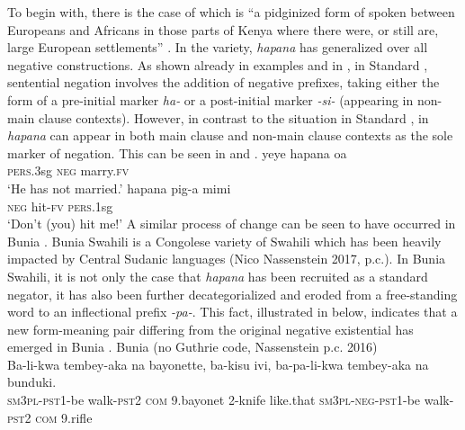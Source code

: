 \documentclass[output=paper]{langscibook}
\begin{document}
To begin with, there is the case of  which is ``a pidginized
form of  spoken between Europeans and Africans in those parts
of Kenya where there were, or still are, large European settlements''
\parencite[51]{Vitale1980}. In the  variety, \textit{hapana} has
generalized over all negative constructions. As shown already in examples
 and  in , in
Standard , sentential negation
involves the addition of negative prefixes, taking either the form of a
pre-initial marker \textit{ha-} or a post-initial marker \textit{-si-}
(appearing in non-main clause contexts). However, in contrast to the
situation in Standard , in  \textit{hapana} can
appear in both main clause and non-main clause contexts as the sole marker
of negation. This can be seen in  and
.
\ea\label{ex:kisetla-marry-hit}
\ea\label{ex:kisetla-marry}
\gll yeye hapana oa\\
	\textsc{pers}.3sg \textsc{neg} marry.\textsc{fv}\\
\glt 	`He has not married.'
\ex\label{ex:kisetla-hit}
\gll hapana pig-a mimi\\
	\textsc{neg} hit-\textsc{fv} \textsc{pers}.1sg\\
\glt 	`Don't (you) hit me!'
\z\z
A similar process of change can be seen to have occurred in
Bunia . Bunia Swahili is a
Congolese variety of Swahili which has been heavily impacted by Central
Sudanic languages (Nico Nassenstein 2017, p.c.). In Bunia Swahili, it is
not only the case that \textit{hapana} has been recruited as a standard
negator, it has also been further decategorialized and eroded from a
free-standing word to an inflectional prefix \textit{-pa-}. This fact,
illustrated in  below, indicates that a new form-meaning
pair differing from the original negative existential has emerged in
Bunia .
%
\ea\label{ex:bunia-arms}
Bunia  (no Guthrie code, Nassenstein p.c. 2016)\\
\gll Ba-li-kwa tembey-aka na bayonette, ba-kisu ivi, ba-pa-li-kwa tembey-aka na bunduki.\\
	\textsc{sm3pl}-\textsc{pst}1-be walk-\textsc{pst}2 \textsc{com} 9.bayonet 2-knife like.that \textsc{sm}3\textsc{pl}-\textsc{neg}-\textsc{pst}1-be walk-\textsc{pst}2 \textsc{com} 9.rifle\\
\end{document}

